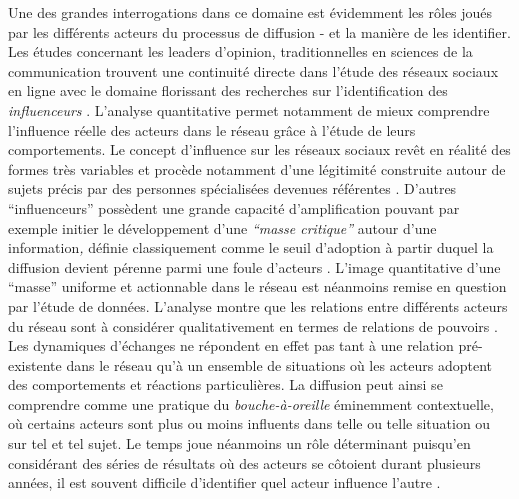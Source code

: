 Une des grandes interrogations dans ce domaine est évidemment les r\^oles joués par les différents acteurs du processus de diffusion - et la manière de les identifier. Les études concernant les leaders d{\textquoteright}opinion, traditionnelles en sciences de la communication \citep{Katz1955} trouvent une continuité directe dans l{\textquoteright}étude des réseaux sociaux en ligne avec le domaine florissant des recherches sur l{\textquoteright}identification des \textit{influenceurs} \citep{Bakshy2011, Leavitt2009}. L{\textquoteright}analyse quantitative permet notamment de mieux comprendre l{\textquoteright}influence réelle des acteurs dans le réseau gr\^ace à l{\textquoteright}étude de leurs comportements. Le concept d{\textquoteright}influence sur les réseaux sociaux rev\^et en réalité des formes très variables et procède notamment d{\textquoteright}une légitimité construite autour de sujets précis par des personnes spécialisées devenues référentes \citep{Cha2010}. D{\textquoteright}autres {\textquotedblleft}influenceurs{\textquotedblright} possèdent une grande capacité d{\textquoteright}amplification pouvant par exemple initier le développement d{\textquoteright}une \textit{{\textquotedblleft}masse critique{\textquotedblright} }autour d{\textquoteright}une information\textit{, }définie classiquement comme le seuil d{\textquoteright}adoption à partir duquel la diffusion devient pérenne parmi une foule d{\textquoteright}acteurs \citep{Oliver2001}. L{\textquoteright}image quantitative d{\textquoteright}une {\textquotedblleft}masse{\textquotedblright} uniforme et actionnable dans le réseau est néanmoins remise en question par l{\textquoteright}étude de données. L{\textquoteright}analyse montre que les relations entre différents acteurs du réseau sont à considérer qualitativement en termes de relations de pouvoirs \citep{Steyer2006}. Les dynamiques d{\textquoteright}échanges ne répondent en effet pas tant à une relation pré-existente dans le réseau qu{\textquoteright}à un ensemble de situations o\`u les acteurs adoptent des comportements et réactions particulières. La diffusion peut ainsi se comprendre comme une pratique du \textit{bouche-à-oreille} éminemment contextuelle, o\`u certains acteurs sont plus ou moins influents dans telle ou telle situation ou sur tel et tel sujet. Le temps joue néanmoins un r\^ole déterminant puisqu{\textquoteright}en considérant des séries de résultats o\`u des acteurs se c\^otoient durant plusieurs années, il est souvent difficile d{\textquoteright}identifier quel acteur influence l{\textquoteright}autre \citep{Aral2009}.

